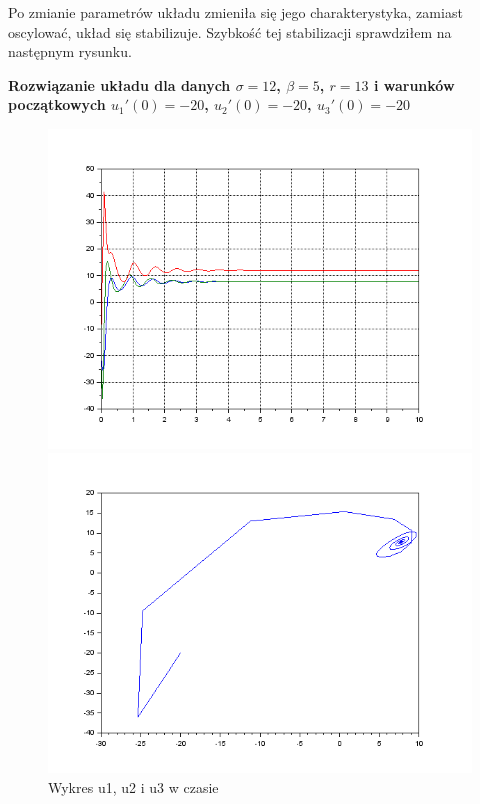 \documentclass[12pt]{article}
\begin{document}
Po zmianie parametrów układu zmieniła się jego charakterystyka, zamiast oscylować, układ się stabilizuje. Szybkość tej stabilizacji sprawdziłem na następnym rysunku.
\begin{center}
    \textbf{Rozwiązanie układu dla danych $\sigma = 12$, $\beta=5$, $r=13$ i warunków początkowych $u_1'(0)=-20$, $u_2'(0)=-20$, $u_3'(0)=-20$}
\end{center}
\begin{figure}[H]
  \centering
  \begin{minipage}[b]{0.49\textwidth}
    \includegraphics[scale=0.4]{./img/7--2011-xy}
    \caption{Wykres u1, u2 i u3 w czasie}
    \end{minipage}
  \hfill
  \begin{minipage}[b]{0.49\textwidth}
    \includegraphics[scale=0.4]{./img/7--2011-phase-1-2}

\end{minipage}
\end{figure}
\end{document}

